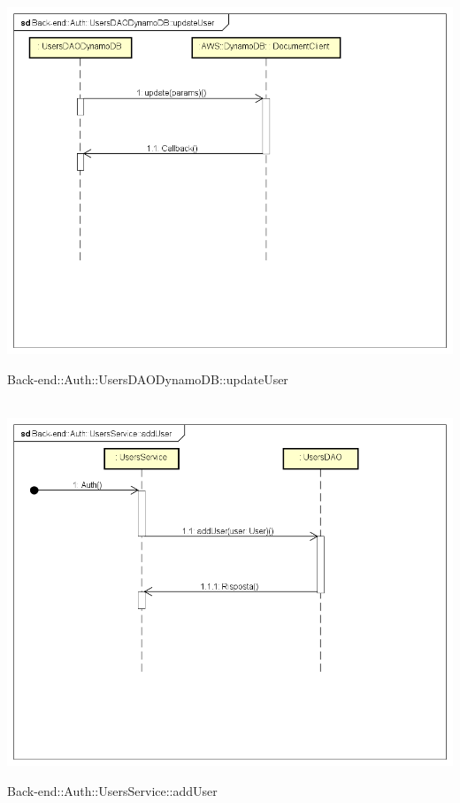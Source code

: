 \\ \includegraphics[width=\textwidth,height=\textheight,keepaspectratio]{images/diagrams/back-end/Ufficial_Backend/Back-end__Auth__UsersDAODynamoDB__updateUser.png} 	\caption{Back-end::Auth::UsersDAODynamoDB::updateUser}
\\ \includegraphics[width=\textwidth,height=\textheight,keepaspectratio]{images/diagrams/back-end/Ufficial_Backend/Back-end__Auth__UsersService__addUser.png} 	\caption{Back-end::Auth::UsersService::addUser}
